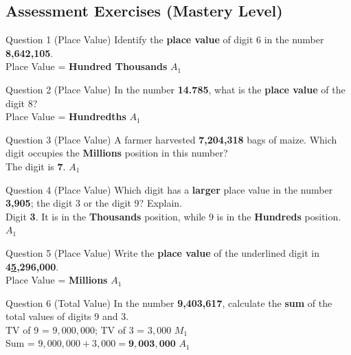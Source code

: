 \documentclass[12pt, a4paper, oneside]{article}
\begin{document}
\subsection*{Assessment Exercises (Mastery Level)}

\begin{solvingbox}{Question 1 (Place Value)}
Identify the \textbf{place value} of digit 6 in the number \textbf{8,642,105}. \\
Place Value = \textbf{Hundred Thousands} \hfill $A_1$
\end{solvingbox}

\begin{solvingbox}{Question 2 (Place Value)}
In the number \textbf{14.785}, what is the \textbf{place value} of the digit 8? \\
Place Value = \textbf{Hundredths} \hfill $A_1$
\end{solvingbox}

\begin{solvingbox}{Question 3 (Place Value)}
A farmer harvested \textbf{7,204,318} bags of maize. Which digit occupies the \textbf{Millions} position in this number? \\
The digit is \textbf{7}. \hfill $A_1$
\end{solvingbox}

\begin{solvingbox}{Question 4 (Place Value)}
Which digit has a \textbf{larger} place value in the number \textbf{3,905}; the digit 3 or the digit 9? Explain. \\
Digit \textbf{3}. It is in the \textbf{Thousands} position, while 9 is in the \textbf{Hundreds} position. \hfill $A_1$
\end{solvingbox}

\begin{solvingbox}{Question 5 (Place Value)}
Write the \textbf{place value} of the underlined digit in \textbf{4\underline{5},296,000}. \\
Place Value = \textbf{Millions} \hfill $A_1$
\end{solvingbox}

\newpage

\begin{solvingbox}{Question 6 (Total Value)}
In the number \textbf{9,403,617}, calculate the \textbf{sum} of the total values of digits 9 and 3. \\
TV of 9 = $9,000,000$; TV of 3 = $3,000$ \hfill $M_1$ \\
Sum = $9,000,000 + 3,000 = \mathbf{9,003,000}$ \hfill $A_1$
\end{solvingbox}
\end{document}
